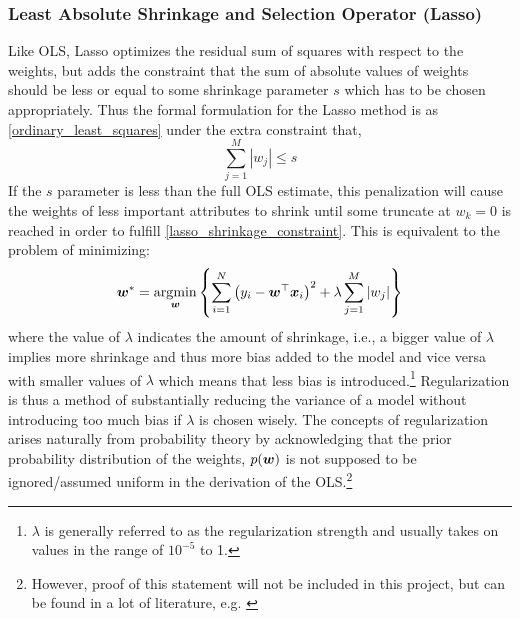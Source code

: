 \subsubsection{Least Absolute Shrinkage and Selection Operator (Lasso)}
Like OLS, Lasso optimizes the residual sum of squares with respect to the weights, but adds the constraint that the sum of absolute values of weights should be less or equal to some shrinkage parameter $s$ which has to be chosen appropriately. Thus the formal formulation for the Lasso method is as \eqref{ordinary_least_squares} under the extra constraint that,
\begin{equation}\label{eq:lasso_shrinkage_constraint}
\sum_{j=1}^{M} \left| w_j \right| \leq s
\end{equation}
If the $s$ parameter is less than the full OLS estimate, this penalization will cause the weights of less important attributes to shrink until some truncate at $w_k=0$ is reached in order to fulfill \eqref{lasso_shrinkage_constraint}. This is equivalent to the problem of minimizing: 
\begin{equation}\label{eq:lasso_prob}
    \boldsymbol{w}^{*} = \operatorname*{\arg\!\min}_{\boldsymbol{w}} \left\{ \sum_{i=1}^{N} \qty(y_i -\boldsymbol{w}^{\top} \bm{x}_i)^2 + \lambda \sum_{j=1}^{M} \left| w_j \right| \right\}
\end{equation}
where the value of $\lambda$ indicates the amount of shrinkage, i.e., a bigger value of $\lambda$ implies more shrinkage and thus more bias added to the model and vice versa with smaller values of $\lambda$ which means that less bias is introduced.\footnote{$\lambda$ is generally referred to as the regularization strength and usually takes on values in the range of $10^{-5}$ to 1.} Regularization is thus a method of substantially reducing the variance of a model without introducing too much bias if $\lambda$ is chosen wisely. The concepts of regularization arises naturally from probability theory by acknowledging that the prior probability distribution of the weights, $p\qty(\boldsymbol{w})$ is not supposed to be ignored/assumed uniform in the derivation of the OLS.\footnote{However, proof of this statement will not be included in this project, but can be found in a lot of literature, e.g. \citep{allhailkingMorten}}


